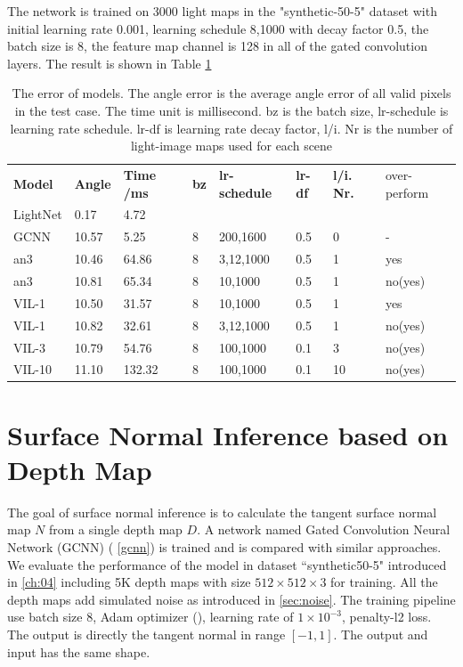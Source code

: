 \documentclass[border=15pt, multi, tikz]{article}
\newcommand{\tabhead}[1]{\textbf{#1}}
\begin{document}
The network is trained on 3000 light maps in the "synthetic-50-5" dataset with initial learning rate 0.001, learning schedule 8,1000 with decay factor 0.5, the batch size is 8, the feature map channel is 128 in all of the gated convolution layers. The result is shown in Table \ref{tab:light-inpainting}


\begin{table}[th]
	
	\centering
	\begin{tabular}{l l l l l l l l }
		\tabhead{Model} & \tabhead{Angle} & \tabhead{Time /ms} & \tabhead{bz} & \tabhead{lr-schedule} & \tabhead{lr-df} & \tabhead{l/i. Nr.} & over-perform\\
		LightNet  & 0.17  & 4.72 & &  & & & \\ 
		\hline
		GCNN  & 10.57 & 5.25 & 8 & 200,1600 & 0.5 & 0 & - \\
		\hline
		an3 & 10.46 & 64.86 & 8 & 3,12,1000  & 0.5 & 1 & yes\\
		\hline
		an3 & 10.81 & 65.34 & 8 & 10,1000  & 0.5 & 1 & no(yes) \\
		\hline
		VIL-1 & 10.50 & 31.57 & 8 & 10,1000 & 0.5 & 1 & yes \\
		\hline
		VIL-1 & 10.82 & 32.61 & 8 & 3,12,1000 & 0.5 & 1 & no(yes) \\
		\hline
		VIL-3  & 10.79 & 54.76 & 8 & 100,1000 & 0.1 & 3 & no(yes) \\
		\hline
		VIL-10  & 11.10 & 132.32 & 8 & 100,1000 & 0.1 &10 & no(yes)\\
	\end{tabular}
	\caption{The error of models. The angle error is the average angle error of all valid pixels in the test case. The time unit is millisecond. bz is the batch size, lr-schedule is learning rate schedule. lr-df is learning rate decay factor, l/i. Nr is the number of light-image maps used for each scene}	
	\label{tab:light-inpainting}
\end{table}


\section{Surface Normal Inference based on Depth Map}
The goal of surface normal inference is to calculate the tangent surface normal map $ N $ from a single depth map $ D $. A network named Gated Convolution Neural Network (GCNN) ( \ref{gcnn}) is trained and is compared with similar approaches. We evaluate the performance of the model in dataset ``synthetic50-5" introduced in  \ref{ch:04} including 5K depth maps with size  $ 512\times512\times3 $ for training. All the depth maps add simulated noise as introduced in \ref{sec:noise}. The training pipeline use batch size $ 8 $,  Adam optimizer (\cite{adam}), learning rate of  $ 1\times10^{-3} $, penalty-l2 loss. The output is directly the tangent normal in range $ \left[-1,1\right] $. The output and input has the same shape. 
\end{document}
